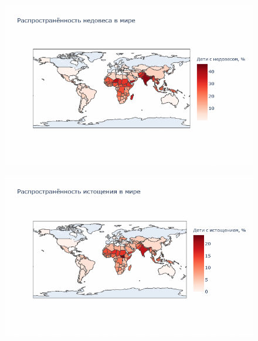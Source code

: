 \documentclass{beamer}
\begin{document}
\begin{frame}

\begin{figure}
	\centering
	\includegraphics[width=125mm]{10.png}
\end{figure}


\end{frame}


\begin{frame}

\begin{figure}
	\centering
	\includegraphics[width=125mm]{11.png}
\end{figure}


\end{frame}
\end{document}
